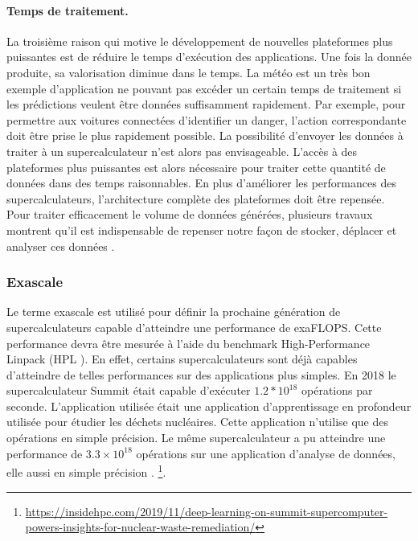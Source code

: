         \paragraph{Temps de traitement.} 
        
            La troisième raison qui motive le développement de nouvelles plateformes plus puissantes est de réduire le temps d'exécution des applications. Une fois la donnée produite, sa valorisation diminue dans le temps. La météo est un très bon exemple d'application ne pouvant pas excéder un certain temps de traitement si les prédictions veulent être données suffisamment rapidement. Par exemple, pour permettre aux voitures connectées d'identifier un danger, l'action correspondante doit être prise le plus rapidement possible. La possibilité d'envoyer les données à traiter à un supercalculateur n'est alors pas envisageable. L'accès à des plateformes plus puissantes est alors nécessaire pour traiter cette quantité de données dans des temps raisonnables. En plus d'améliorer les performances des supercalculateurs, l'architecture complète des plateformes doit être repensée. Pour traiter efficacement le volume de données générées, plusieurs travaux montrent qu'il est indispensable de repenser notre façon de stocker, déplacer et analyser ces données \cite{Saltz2018, Chen2014, Nahrstedt2017, GeoffreyFoxJhaShantenu2015}.
  
 
    \subsubsection{Exascale}\label{sec:exascale}
        
      
        
        Le terme \gls{exascale} est utilisé pour définir la prochaine génération de supercalculateurs capable d'atteindre une performance de \gls{exaFLOPS}. Cette performance devra être mesurée à l'aide du benchmark High-Performance Linpack (HPL \cite{Dongarra2003}). En effet, certains supercalculateurs sont déjà capables d'atteindre de telles performances sur des applications plus simples. En 2018 le supercalculateur Summit était capable d'exécuter $1.2 * 10^{18}$ opérations par seconde. L'application utilisée était une application d'apprentissage en profondeur utilisée pour étudier les déchets nucléaires.  Cette application n'utilise que des opérations en simple précision. Le même supercalculateur a pu atteindre une performance de $3.3 \times 10^{18}$ opérations sur une application d'analyse de données, elle aussi en simple précision \cite{Bergman2018}.
         \footnote{\url{https://insidehpc.com/2019/11/deep-learning-on-summit-supercomputer-powers-insights-for-nuclear-waste-remediation/}}. 
        
